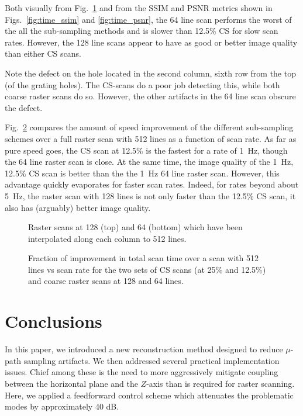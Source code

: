 \documentclass[journal]{IEEEtran}
\begin{document}
Both visually from Fig.~\ref{fig:results_subline_images} and from the SSIM and PSNR metrics shown in 
Figs.~\ref{fig:time_ssim} and \ref{fig:time_psnr}, the 64 line
scan performs the worst of the all the sub-sampling methods and is
slower than 12.5\% CS for slow scan rates. However, the 128 line scans
appear to have as good or better image quality than either CS scans.

Note the defect on the hole located in the second column, sixth row
from the top (of the grating holes). The CS-scans do a poor job
detecting this, while both coarse raster scans do so. However, the
other artifacts in the 64 line scan obscure the defect.

Fig.~\ref{fig:improve_512} compares the amount of speed improvement of
the different sub-sampling schemes over a full raster scan with 512
lines as a function of scan rate. As far as pure speed goes, the CS
scan at 12.5\% is the fastest for a rate of 1~Hz, though the 64 line
raster scan is close. At the same time, the image quality of the 1~Hz,
12.5\% CS scan is better than the the 1~Hz 64 line raster scan.
However, this advantage quickly evaporates for faster scan rates.
Indeed, for rates beyond about 5~Hz, the raster scan with 128 lines is
not only faster than the 12.5\% CS scan, it also has (arguably) better
image quality.

\begin{figure}
  \centering
  
  \caption{Raster scans at 128 (top) and 64 (bottom) which have been
    interpolated along each column to 512 lines.}
  \label{fig:results_subline_images}
\end{figure}

\begin{figure}
  
  \caption{Fraction of improvement in total scan time over a scan with
    512 lines vs scan rate for the two sets of CS scans (at 25\%
    and 12.5\%) and coarse raster scans at 128 and 64 lines.}
  \label{fig:improve_512}
\end{figure}

\section{Conclusions}\label{sec:conclusions}
In this paper, we introduced a new reconstruction method designed to reduce $\mu$-path
sampling artifacts. We then addressed several practical implementation issues.
Chief among these is the need to more aggressively mitigate coupling between the
horizontal plane and the $Z$-axis than is required for raster scanning. Here, we applied
a feedforward control scheme which attenuates the problematic modes by approximately 40 dB.
\end{document}
